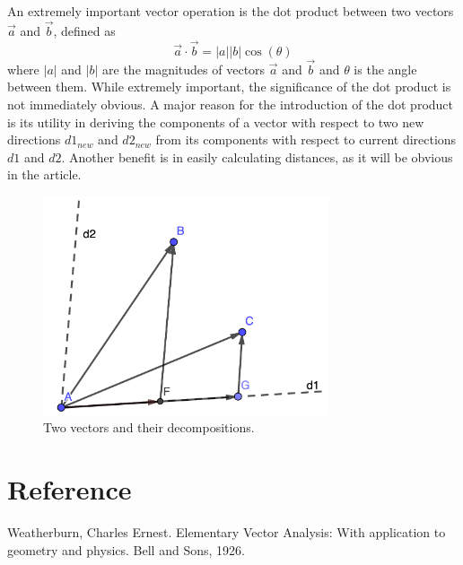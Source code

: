 \documentclass[12pt]{article}
\begin{document}
An extremely important vector operation is the dot product between two vectors $\vec{a}$ and $\vec{b}$, defined as 
\begin{equation}
\vec{a}\cdot\vec{b}=|a||b|\cos(\theta)
\label{eq:dotProduct}
\end{equation}
where $|a|$ and $|b|$ are the magnitudes of vectors $\vec{a}$ and $\vec{b}$ and $\theta$ is the angle between them.  While extremely important, the significance of the dot product is not immediately obvious. A major reason for the introduction of the dot product is its utility in deriving the components of a vector with respect to two new directions $d1_{new}$ and $d2_{new}$ from its components with respect to current directions $d1$ and $d2$.  Another benefit is in easily calculating distances, as it will be obvious in the article.

\begin{figure}[h]
    \centering
    \includegraphics[width=0.75\textwidth]{Vectors.png}
    \caption{Two vectors and their decompositions.}
    \label{fig:vectors}
    \end{figure}
\section{Reference}
Weatherburn, Charles Ernest. Elementary Vector Analysis: With application to geometry and physics. Bell and Sons, 1926.
\end{document}
